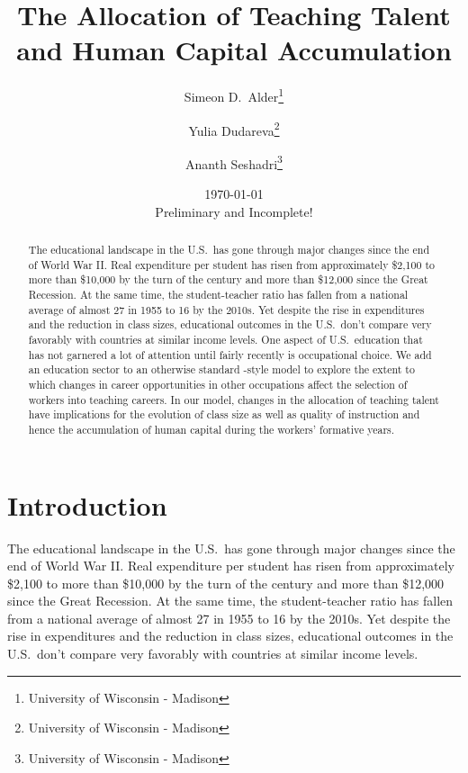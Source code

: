 \documentclass[onehalfspacing,11pt]{article}
\begin{document}
\begin{titlepage}
\title{The Allocation of Teaching Talent and Human Capital Accumulation}
\author{Simeon D.~Alder\footnote{University of Wisconsin - Madison} \and Yulia Dudareva\footnote{University of Wisconsin - Madison} \and Ananth Seshadri\footnote{University of Wisconsin - Madison}}
\date{\today \\ \vspace{5mm} {\sc Preliminary and Incomplete!}}

\maketitle

\begin{abstract}
The educational landscape in the U.S.~has gone through major changes since the end of World War II. Real expenditure per student has risen from approximately \$2,100 to more than \$10,000 by the turn of the century and more than \$12,000 since the Great Recession. At the same time, the student-teacher ratio has fallen from a national average of almost 27 in 1955 to 16 by the 2010s. Yet despite the rise in expenditures and the reduction in class sizes, educational outcomes in the U.S.~don't compare very favorably with countries at similar income levels. One aspect of U.S.~education that has not garnered a lot of attention until fairly recently is occupational choice. We add an education sector to an otherwise standard \cite{Hsieh:2018}-style model to explore the extent to which changes in career opportunities in other occupations affect the selection of workers into teaching careers. In our model, changes in the allocation of teaching talent have implications for the evolution of class size as well as quality of instruction and hence the accumulation of human capital during the workers' formative years.
\end{abstract}
\end{titlepage}

\section{Introduction}
The educational landscape in the U.S.~has gone through major changes since the end of World War II. Real expenditure per student has risen from approximately \$2,100 to more than \$10,000 by the turn of the century and more than \$12,000 since the Great Recession. At the same time, the student-teacher ratio has fallen from a national average of almost 27 in 1955 to 16 by the 2010s. Yet despite the rise in expenditures and the reduction in class sizes, educational outcomes in the U.S.~don't compare very favorably with countries at similar income levels.
\end{document}
